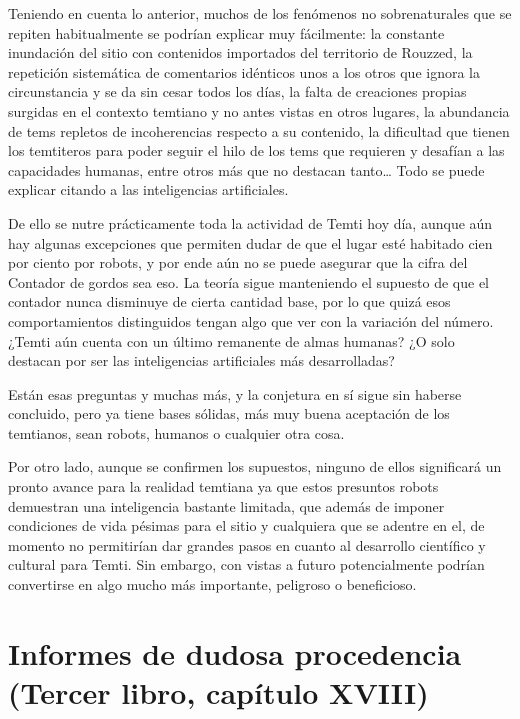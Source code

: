 \documentclass[
  spanish,
]{book}
\begin{document}
Teniendo en cuenta lo anterior, muchos de los fenómenos no sobrenaturales que se repiten habitualmente se podrían explicar muy fácilmente: la constante inundación del sitio con contenidos importados del territorio de Rouzzed, la repetición sistemática de comentarios idénticos unos a los otros que ignora la circunstancia y se da sin cesar todos los días, la falta de creaciones propias surgidas en el contexto temtiano y no antes vistas en otros lugares, la abundancia de tems repletos de incoherencias respecto a su contenido, la dificultad que tienen los temtiteros para poder seguir el hilo de los tems que requieren y desafían a las capacidades humanas, entre otros más que no destacan tanto\ldots{} Todo se puede explicar citando a las inteligencias artificiales.

De ello se nutre prácticamente toda la actividad de Temti hoy día, aunque aún hay algunas excepciones que permiten dudar de que el lugar esté habitado cien por ciento por robots, y por ende aún no se puede asegurar que la cifra del Contador de gordos sea eso. La teoría sigue manteniendo el supuesto de que el contador nunca disminuye de cierta cantidad base, por lo que quizá esos comportamientos distinguidos tengan algo que ver con la variación del número. ¿Temti aún cuenta con un último remanente de almas humanas? ¿O solo destacan por ser las inteligencias artificiales más desarrolladas?

Están esas preguntas y muchas más, y la conjetura en sí sigue sin haberse concluido, pero ya tiene bases sólidas, más muy buena aceptación de los temtianos, sean robots, humanos o cualquier otra cosa.

Por otro lado, aunque se confirmen los supuestos, ninguno de ellos significará un pronto avance para la realidad temtiana ya que estos presuntos robots demuestran una inteligencia bastante limitada, que además de imponer condiciones de vida pésimas para el sitio y cualquiera que se adentre en el, de momento no permitirían dar grandes pasos en cuanto al desarrollo científico y cultural para Temti. Sin embargo, con vistas a futuro potencialmente podrían convertirse en algo mucho más importante, peligroso o beneficioso.

\hypertarget{informes-de-dudosa-procedencia-tercer-libro-capuxedtulo-xviii}{%
\section{Informes de dudosa procedencia (Tercer libro, capítulo XVIII)}\label{informes-de-dudosa-procedencia-tercer-libro-capuxedtulo-xviii}}
\end{document}
